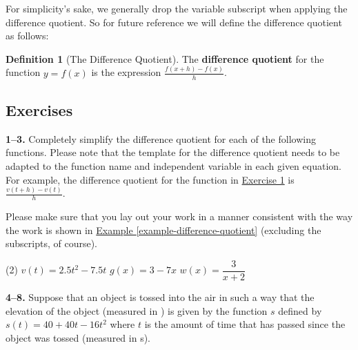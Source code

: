 \documentclass[10pt,oneside,]{book}
\newcommand{\terminology}[1]{\textbf{#1}}
\theoremstyle{plain}
\theoremstyle{definition}
\newtheorem{definition}[theorem]{Definition}
\numberwithin{equation}{section}
\newcommand{\fe}[2]{#1\mathopen{}\left(#2\right)\mathclose{}}
\begin{document}
\par
For simplicity's sake, we generally drop the variable subscript when applying the difference quotient. So for future reference we will define the difference quotient as follows:%
\begin{definition}[The Difference Quotient]\label{definition-difference-quotient}
The \terminology{difference quotient} for the function \(y=\fe{f}{x}\) is the expression \(\frac{\fe{f}{x+h}-\fe{f}{x}}{h}\).%
\end{definition}
\typeout{************************************************}
\typeout{************************************************}
\subsection[Exercises]{Exercises}\label{exercises-3}
\textbf{1--3. }\hypertarget{exercisegroup-3}{\null}Completely simplify the difference quotient for each of the following functions. Please note that the template for the difference quotient needs to be adapted to the function name and independent variable in each given equation. For example, the difference quotient for the function in \hyperlink{exercise-first-difference-quotient}{Exercise 1} is \(\frac{\fe{v}{t+h}-\fe{v}{t}}{h}\).%
\par
Please make sure that you lay out your work in a manner consistent with the way the work is shown in \hyperref[example-difference-quotient]{Example \ref{example-difference-quotient}} (excluding the subscripts, of course).%
\par
\begin{exercisegroup}(2)
\exercise[1.]\hypertarget{exercise-first-difference-quotient}{\null}\(\fe{v}{t}=2.5t^2-7.5t\)%
\exercise[2.]\hypertarget{exercise-10}{\null}\(\fe{g}{x}=3-7x\)%
\exercise[3.]\hypertarget{exercise-11}{\null}\(\fe{w}{x}=\dfrac{3}{x+2}\)%
\end{exercisegroup}
\par\smallskip\noindent
\textbf{4--8. }\hypertarget{exercisegroup-4}{\null}Suppose that an object is tossed into the air in such a way that the elevation of the object (measured in \si{\foot}) is given by the function \(s\) defined by \(\fe{s}{t}=40+40t-16t^2\) where \(t\) is the amount of time that has passed since the object was tossed (measured in \si{\second}).%
\par
\end{document}
